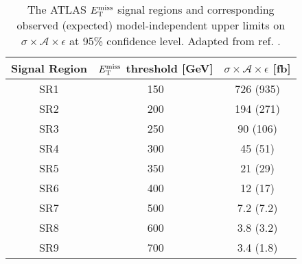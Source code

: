 \begin{table}[!htbp]
\centering
\begin{tabular}{c|c|c}
 \hline
 \hline
 Signal Region & $E_{\mathrm{T}}^{\mathrm{miss}}$ threshold [GeV] & $\sigma \times \mathcal{A} \times \epsilon$ [fb] \\ %
 \hline
 SR1 & 150 & 726 (935) \\ %
 SR2 & 200 & 194 (271) \\ %
 SR3 & 250 & 90 (106) \\ %
 SR4 & 300 & 45 (51) \\ %
 SR5 & 350 & 21 (29) \\ %
 SR6 & 400 & 12 (17) \\ %
 SR7 & 500 & 7.2 (7.2) \\ %
 SR8 & 600 & 3.8 (3.2) \\ %
 SR9 & 700 & 3.4 (1.8) \\ %
 \hline
 \hline
\end{tabular}
\caption{The ATLAS \monojet $E_{\mathrm{T}}^{\mathrm{miss}}$ signal regions and corresponding observed (expected) model-independent upper limits on $\sigma \times \mathcal{A} \times \epsilon$ at 95\% confidence level. Adapted from ref. \cite{Aad:2015zva}.
}
\label{monojet_SRs}
\end{table}

